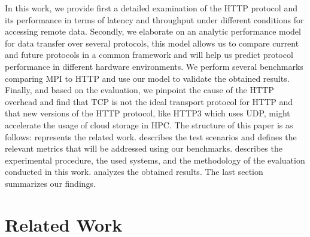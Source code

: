 \documentclass[runningheads]{llncs}
\begin{document}
In this work, we provide first a detailed examination of the HTTP protocol and its performance in terms of latency and throughput under different conditions for accessing remote data. Secondly, we elaborate on an analytic performance model for data transfer over several protocols, this model allows us to compare current and future protocols in a common framework and will help us predict protocol performance in different hardware environments. We perform several benchmarks comparing MPI to HTTP and use our model to validate the obtained results. Finally, and based on the evaluation, we pinpoint the cause of the HTTP overhead and find that TCP is not the ideal transport protocol for HTTP and that new versions of the HTTP protocol, like HTTP3 which uses UDP, might accelerate the usage of cloud storage in HPC.
The structure of this paper is as follows:  represents the related work.  describes the test scenarios and defines the relevant metrics that will be addressed using our benchmarks.  describes the experimental procedure, the used systems, and the methodology of the evaluation conducted in this work.  analyzes the obtained results. The last section summarizes our findings.

\section {Related Work} \label{sec:related}
\end{document}
